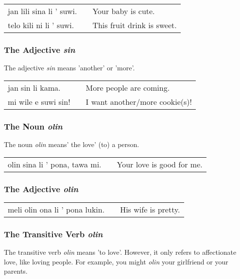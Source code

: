 \begin{supertabular}{p{5,5cm}|ll}
    jan lili sina li ' suwi. &  & Your baby is cute.         \\
    telo kili ni li ' suwi.  &  & This fruit drink is sweet. \\
\end{supertabular}

\subsubsection*{The Adjective  \textit{sin}}
The adjective \textit{sin} means 'another' or 'more'.

\begin{supertabular}{p{5,5cm}|ll}
    jan sin li kama.    &  & More people are coming.        \\
    mi wile e suwi sin! &  & I want another/more cookie(s)! \\
\end{supertabular}

\subsubsection*{The Noun \textit{olin}}
The noun \textit{olin} means' the love' (to) a person.

\begin{supertabular}{p{5,5cm}|ll}
    olin sina li ' pona, tawa mi. &  & Your love is good for me. \\
\end{supertabular}

\subsubsection*{The Adjective \textit{olin}}
\begin{supertabular}{p{5,5cm}|ll}
    meli olin ona li ' pona lukin. &  & His wife is pretty. \\
\end{supertabular}

\subsubsection*{The Transitive Verb \textit{olin}}
The transitive verb \textit{olin} means 'to love'.
However, it only refers to affectionate love, like loving people.
For example, you might \textit{olin} your girlfriend or your parents.

